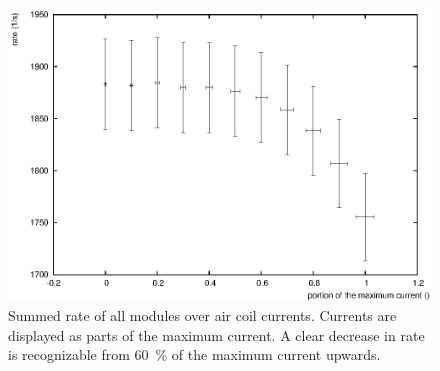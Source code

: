   \begin{figure}

  \centering
  	\includegraphics[width = 0.9 \textwidth]{graphics/aircoilCounts/aircoilsCountsCurrent.eps}
  	\caption[Rate dependence on magnetic fields]{Summed rate of all modules over air coil currents. Currents are displayed as parts of the maximum current. A clear decrease in rate is recognizable from \SI{60}{\percent} of the maximum current upwards.}
  	\label{fig:aircoilCountsCurrent}
  \end{figure}
  

